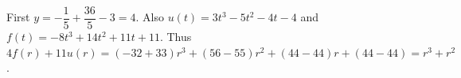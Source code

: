 First $y=-\dfrac{1}{5}+\dfrac{36}{5}-3=4$. Also $u(t)=3t^3-5t^2-4t-4$ and $f(t)=-8t^3+14t^2+11t+11$. Thus $4f(r)+11u(r)=(-32+33)r^3+(56-55)r^2+(44-44)r+(44-44)=\boxed{r^3+r^2}$.
